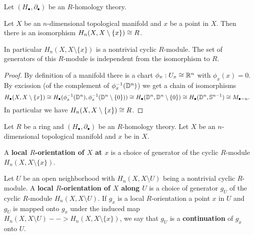 	\begin{lemma}
		Let $(H_\bullet,\partial_\bullet)$ be an $R$-homology theory.

		Let $X$ be an $n$-dimensional topological manifold and $x$ be a point in $X$. Then there is an isomorphism $H_n(X,X\setminus \{x\}) \cong R$. 

		In particular $H_n(X,X\setminus\{x\})$ is a nontrivial cyclic $R$-module. The set of generators of this $R$-module is independent from the isomorphism to $R$.
	\end{lemma}
	\begin{proof}
		By definition of a manifold there is a chart $\phi_x: U_x \cong \mathbb{R}^n$ with $\phi_x(x) = 0$. By excission (of the complement of $\phi_x^{-1}(\mathbb{D}^n)$) we get a chain of isomorphisms
		\begin{equation*}
			H_\bullet(X,X\setminus\{x\}) \cong H_\bullet(\phi_x^{-1}(\mathbb{D}^n),\phi_x^{-1}(\mathbb{D}^n\setminus \{0\})) \cong H_\bullet(\mathbb{D}^n,\mathbb{D}^n\setminus \{0\}) \cong H_\bullet(\mathbb{D}^n,\mathbb{S}^{n-1}) \cong M_{\bullet-n}.
		\end{equation*}
		In particular we have $H_n(X,X\setminus\{x\}) \cong R$. 
	\end{proof}

	\begin{definition}
		Let $R$ be a ring and $(H_\bullet, \partial_\bullet)$ be an $R$-homology theory. Let $X$ be an $n$-dimensional topological manifold and $x$ be in $X$. 

		A \textbf{local $R$-orientation of $X$ at $x$} is a choice of generator of the cyclic $R$-module $H_n(X,X\setminus\{x\})$.

		Let $U$ be an open neighborhood with $H_n(X,X\setminus U)$ being a nontrivial cyclic $R$-module. A \textbf{local $R$-orientation of $X$ along $U$} is a choice of generator $g_U$ of the cyclic $R$-module $H_n(X,X\setminus U)$. If $g_x$ is a local $R$-orientation a point $x$ in $U$ and $g_U$ is mapped onto $g_x$ under the induced map $H_n(X,X\setminus U) --> H_n(X,X\setminus \{x\})$, we say that $g_U$ is a \textbf{continuation} of $g_x$ onto $U$.
	\end{definition}


